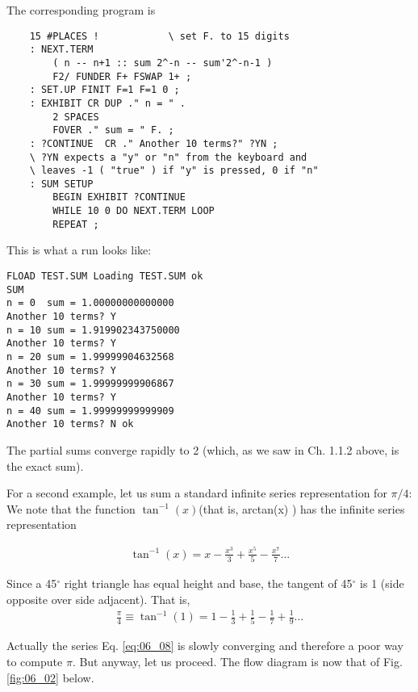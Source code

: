 The corresponding program is

\begin{lstlisting}
    15 #PLACES !            \ set F. to 15 digits
    : NEXT.TERM
        ( n -- n+1 :: sum 2^-n -- sum'2^-n-1 )
        F2/ FUNDER F+ FSWAP 1+ ;
    : SET.UP FINIT F=1 F=1 0 ;
    : EXHIBIT CR DUP ." n = " .
        2 SPACES
        FOVER ." sum = " F. ;
    : ?CONTINUE  CR ." Another 10 terms?" ?YN ;
    \ ?YN expects a "y" or "n" from the keyboard and
    \ leaves -1 ( "true" ) if "y" is pressed, 0 if "n"
    : SUM SETUP
        BEGIN EXHIBIT ?CONTINUE
        WHILE 10 0 DO NEXT.TERM LOOP
        REPEAT ;
\end{lstlisting}

This is what a run looks like:

\begin{lstlisting}
FLOAD TEST.SUM Loading TEST.SUM ok
SUM
n = 0  sum = 1.00000000000000
Another 10 terms? Y
n = 10 sum = 1.919902343750000
Another 10 terms? Y
n = 20 sum = 1.99999904632568
Another 10 terms? Y
n = 30 sum = 1.99999999906867
Another 10 terms? Y
n = 40 sum = 1.99999999999909
Another 10 terms? N ok
\end{lstlisting}

The partial sums converge rapidly to 2 (which, as we saw in Ch. 1.1.2 above, is the exact sum).

For a second example, let us sum a standard infinite series representation for $\pi/4$: We note that the function $\tan^{-1}(x)$(that is, arctan(x) ) has the infinite series representation

\begin{align}
    \tan^{-1}(x) = x - \frac{x^{3}}{3} + \frac{x^{5}}{5} - \frac{x^{7}}{7} ...
    \label{eq:06_07}
\end{align}

Since a 45$^{\circ}$ right triangle has equal height and base, the tangent of 45$^{\circ}$ is 1 (side opposite over side adjacent). That is,
\begin{align}
    \frac{\pi}{4} \equiv \tan^{-1}(1) = 1 - \frac{1}{3} + \frac{1}{5} - \frac{1}{7} + \frac{1}{9}...
    \label{eq:06_08}
\end{align}

Actually the series Eq. \ref{eq:06_08} is slowly converging and therefore a poor way to compute $\pi$. But anyway, let us proceed. The flow diagram is now that of Fig. \ref{fig:06_02} below.

